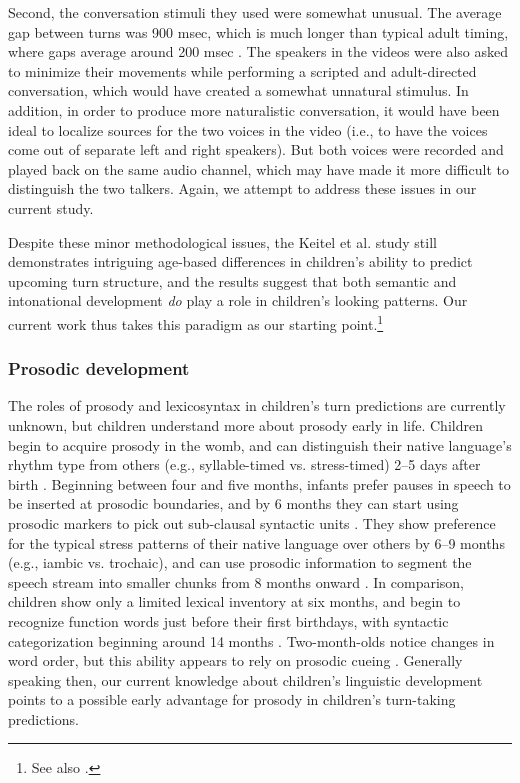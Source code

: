 \documentclass[authoryear, 12pt]{elsarticle}
\begin{document}
Second, the conversation stimuli they used were somewhat unusual. The average gap between turns was 900 msec, which is much longer than typical adult timing, where gaps average around 200 msec \citep{stivers2009}. The speakers in the videos were also asked to minimize their movements while performing a scripted and adult-directed conversation, which would have created a somewhat unnatural stimulus. In addition, in order to produce more naturalistic conversation, it would have been ideal to localize sources for the two voices in the video (i.e., to have the voices come out of separate left and right speakers). But both voices were recorded and played back on the same audio channel, which may have made it more difficult to distinguish the two talkers. Again, we attempt to address these issues in our current study. 

Despite these minor methodological issues, the Keitel et al. \citeyearpar{keitel2013} study still demonstrates intriguing age-based differences in children's ability to predict upcoming turn structure, and the results suggest that both semantic and intonational development \textit{do} play a role in children's looking patterns. Our current work thus takes this paradigm as our starting point.\footnote{See also \citet{casillas2012, casillas2013}.}

\subsubsection{Prosodic development}
The roles of prosody and lexicosyntax in children's turn predictions are currently unknown, but children understand more about prosody early in life. Children begin to acquire prosody in the womb, and can distinguish their native language's rhythm type from others (e.g., syllable-timed vs. stress-timed) 2--5 days after birth \citep{mehler1988, moon1993, nazzi2003}. Beginning between four and five months, infants prefer pauses in speech to be inserted at prosodic boundaries, and by 6 months they can start using prosodic markers to pick out sub-clausal syntactic units \citep{jusczyk1995, soderstrom2003}. They show preference for the typical stress patterns of their native language over others by 6--9 months (e.g., iambic vs. trochaic), and can use prosodic information to segment the speech stream into smaller chunks from 8 months onward \citep{johnson2001, jusczyk1993, morgan1995}. In comparison, children show only a limited lexical inventory at six months, and begin to recognize function words just before their first birthdays, with syntactic categorization beginning around 14 months \citep{bergelson2013, shi2010}. Two-month-olds notice changes in word order, but this ability appears to rely on prosodic cueing \citep{mandel1996}. Generally speaking then, our current knowledge about children's linguistic development points to a possible early advantage for prosody in children's turn-taking predictions.
\end{document}
